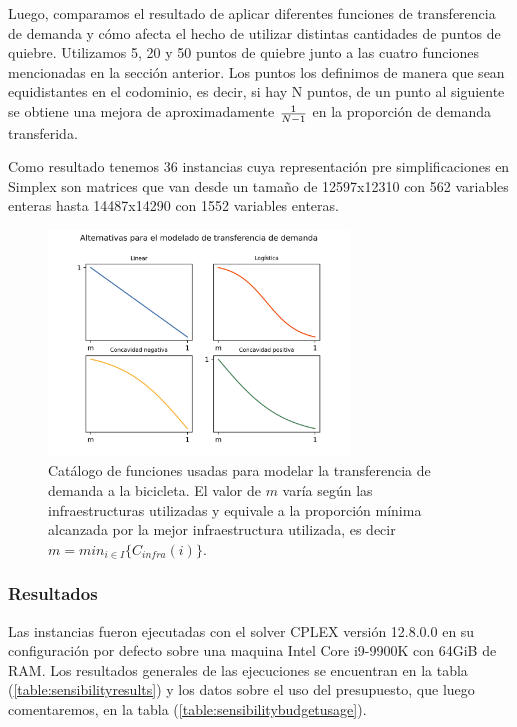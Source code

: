 \documentclass{article}
\begin{document}
  Luego, comparamos el resultado de aplicar diferentes funciones de transferencia de demanda y cómo afecta el hecho de utilizar distintas cantidades de puntos de quiebre. Utilizamos 5, 20 y 50 puntos de quiebre junto a las cuatro funciones mencionadas en la sección anterior. Los puntos los definimos de manera que sean equidistantes en el codominio, es decir, si hay N puntos, de un punto al siguiente se obtiene una mejora de aproximadamente ${1 \over N - 1}$ en la proporción de demanda transferida.

  Como resultado tenemos 36 instancias cuya representación pre simplificaciones en Simplex son matrices que van desde un tamaño de 12597x12310 con 562 variables enteras hasta 14487x14290 con 1552 variables enteras.

  \begin{figure}[h!]
    \centering
    \includegraphics[width=8cm]{../resources/f_catalog.png}
      \caption{Catálogo de funciones usadas para modelar la transferencia de demanda a la bicicleta. El valor de $m$ varía según las infraestructuras utilizadas y equivale a la proporción mínima alcanzada por la mejor infraestructura utilizada, es decir $m = min_{i \in I} \{ C_{infra}(i) \}$.}
    \label{fig:fcatalog}
  \end{figure}

  \FloatBarrier
  \subsubsection{Resultados}

  Las instancias fueron ejecutadas con el solver CPLEX versión 12.8.0.0 en su configuración por defecto sobre una maquina Intel Core i9-9900K con 64GiB de RAM. Los resultados generales de las ejecuciones se encuentran en la tabla (\ref{table:sensibilityresults}) y los datos sobre el uso del presupuesto, que luego comentaremos, en la tabla (\ref{table:sensibilitybudgetusage}).
\end{document}
